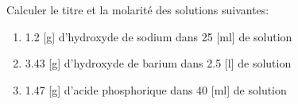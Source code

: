 \documentclass[
  11pt,
  french,
  a4paper,
  openany]{book}
\providecommand{\tightlist}{%
  \setlength{\itemsep}{0pt}\setlength{\parskip}{0pt}}
\begin{document}
\newpage

\begin{Exercise}

Calculer le titre et la molarité des solutions suivantes:

\begin{enumerate}
\def\labelenumi{\alph{enumi}.}
\tightlist
\item
  1.2 {[}g{]} d'hydroxyde de sodium dans 25 {[}ml{]} de solution\\
\item
  3.43 {[}g{]} d'hydroxyde de barium dans 2.5 {[}l{]} de solution\\
\item
  1.47 {[}g{]} d'acide phosphorique dans 40 {[}ml{]} de solution\\
\end{enumerate}


\end{Exercise}
\end{document}
